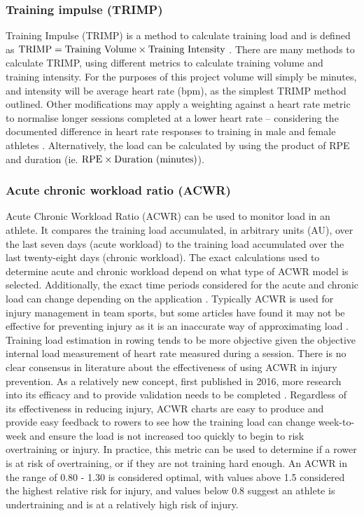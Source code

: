 \subsubsection{Training impulse (TRIMP)\label{subsec:trimp}}
Training Impulse (TRIMP) is a method to calculate training load and is defined as  $\textnormal{TRIMP} = \textnormal{Training Volume} \times \textnormal{Training Intensity}$ \autocite{TRIMPmethod}. There are many methods to calculate TRIMP, using different metrics to calculate training volume and training intensity. For the purposes of this project volume will simply be minutes, and intensity will be average heart rate (bpm), as the simplest TRIMP method outlined. Other modifications may apply a weighting against a heart rate metric to normalise longer sessions completed at a lower heart rate -- considering the documented difference in heart rate responses to training in male and female athletes \autocite{Morton1990}. Alternatively, the load can be calculated by using the product of RPE and duration (ie. $\textnormal{RPE} \times \textnormal{Duration (minutes)}$).

\subsubsection{Acute chronic workload ratio (ACWR)}
Acute Chronic Workload Ratio (ACWR) can be used to monitor load in an athlete. It compares the training load accumulated, in arbitrary units (AU), over the last seven days (acute workload) to the training load accumulated over the last twenty-eight days (chronic workload). The exact calculations used to determine acute and chronic workload depend on what type of ACWR model is selected. Additionally, the exact time periods considered for the acute and chronic load can change depending on the application \cite{White2023}. Typically ACWR is used for injury management in team sports, but some articles have found it may not be effective for preventing injury as it is an inaccurate way of approximating load \cite{Impellizzeri2020}. Training load estimation in rowing tends to be more objective given the objective internal load measurement of heart rate measured during a session. There is no clear consensus in literature about the effectiveness of using ACWR in injury prevention. As a relatively new concept, first published in 2016, more research into its efficacy and to provide validation needs to be completed \cite{Zouhal2021}. Regardless of its effectiveness in reducing injury, ACWR charts are easy to produce and provide easy feedback to rowers to see how the training load can change week-to-week and ensure the load is not increased too quickly to begin to risk overtraining or injury. 
In practice, this metric can be used to determine if a rower is at risk of overtraining, or if they are not training hard enough. An ACWR in the range of 0.80 - 1.30 is considered optimal, with values above 1.5 considered the highest relative risk for injury, and values below 0.8 suggest an athlete is undertraining and is at a relatively high risk of injury.


